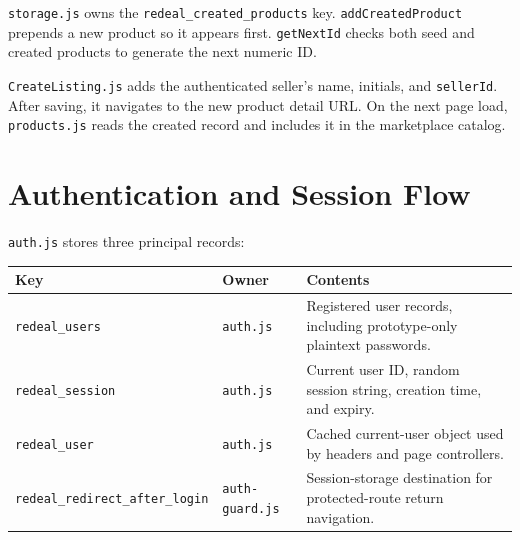 \documentclass[10pt]{article}
\newcommand{\code}[1]{\texttt{#1}}
\begin{document}
\code{storage.js} owns the \code{redeal\_created\_products} key. \code{addCreatedProduct} prepends a new product so it appears first. \code{getNextId} checks both seed and created products to generate the next numeric ID.

\code{CreateListing.js} adds the authenticated seller's name, initials, and \code{sellerId}. After saving, it navigates to the new product detail URL. On the next page load, \code{products.js} reads the created record and includes it in the marketplace catalog.


\section{Authentication and Session Flow}

\code{auth.js} stores three principal records:

\begin{tabular}{@{}p{4.2cm}p{3.5cm}p{5.6cm}@{}}
\toprule
\textbf{Key} & \textbf{Owner} & \textbf{Contents} \\
\midrule
\code{redeal\_users} & \code{auth.js} & Registered user records, including prototype-only plaintext passwords. \\
\code{redeal\_session} & \code{auth.js} & Current user ID, random session string, creation time, and expiry. \\
\code{redeal\_user} & \code{auth.js} & Cached current-user object used by headers and page controllers. \\
\code{redeal\_redirect\_after\_login} & \code{auth-guard.js} & Session-storage destination for protected-route return navigation. \\
\bottomrule
\end{tabular}
\end{document}
